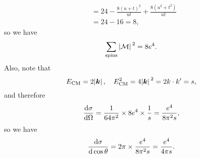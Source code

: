\documentclass[hyperref, a4paper]{article}
\begin{document}
\begin{itemize}
\[\begin{aligned}
        &= 24 - \frac{8 (u+t)^2}{ut} + \frac{8 (u^2 + t^2)}{ut} \\
        &= 24 - 16 = 8,
    \end{aligned}
\]
so we have 
\begin{equation}
    \sum_\text{spins} \abs*{\mathcal{M}}^2 = 8 e^4.
\end{equation}
Also, note that 
\[
    E_\text{CM} = 2 \abs*{\vb*{k}}, \quad E_\text{CM}^2 = 4 \abs*{\vb*{k}}^2 = 2 k \cdot k' = s,
\]
and therefore 
\begin{equation}
    \dv{\sigma}{\Omega} = \frac{1}{64\pi^2} \times 8 e^4 \times \frac{1}{s} = \frac{e^4}{8 \pi^2 s},
\end{equation}
so we have 
\begin{equation}
    \dv{\sigma}{\cos \theta} = 2 \pi \times \frac{e^4}{8 \pi^2 s} = \frac{e^4}{4 \pi s}.
\end{equation}

% 


\end{itemize}
\end{document}
